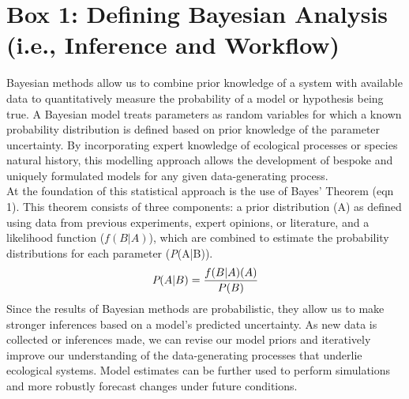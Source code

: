\documentclass{article}
\begin{document}
\par 
\section* {Box 1: Defining Bayesian Analysis (i.e., Inference and Workflow)}

Bayesian methods allow us to combine prior knowledge of a system with available data to quantitatively measure the probability of a model or hypothesis being true. A Bayesian model treats parameters as random variables for which a known probability distribution is defined based on prior knowledge of the parameter uncertainty. By incorporating expert knowledge of ecological processes or species natural history, this modelling approach allows the development of bespoke and uniquely formulated models for any given data-generating process.\\

At the foundation of this statistical approach is the use of Bayes' Theorem (eqn 1). This theorem consists of three components: a prior distribution (A) %
as defined using data from previous experiments, expert opinions, or literature, and a likelihood function ($f(B|A)$), which are combined to estimate the probability distributions for each parameter (\emph{P}(A|B)). \\
\begin{align}
 \emph{P}(A|B) = \frac{f(B|A)(A)}{P(B)}
 \end{align}
Since the results of Bayesian methods are probabilistic, they allow us to make stronger inferences based on a model's predicted uncertainty. As new data is collected or inferences made, we can revise our model priors and iteratively improve our understanding of the data-generating processes that underlie ecological systems. Model estimates can be further used to perform simulations and more robustly forecast changes under future conditions. 
\end{document}
